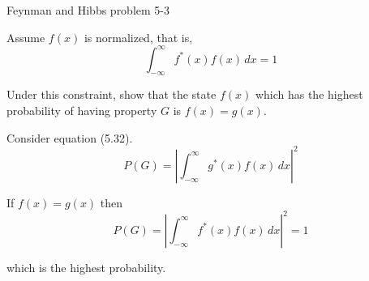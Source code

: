 \documentclass[12pt]{article}
\begin{document}
\begin{center}
Feynman and Hibbs problem 5-3
\end{center}

Assume $f(x)$ is normalized, that is,
\begin{equation*}
\int_{-\infty}^\infty f^*(x)f(x)\,dx=1
\end{equation*}

Under this constraint, show that the state $f(x)$ which has the
highest probability of having property $G$ is $f(x)=g(x)$.

\bigskip
Consider equation (5.32).
\begin{equation*}
P(G)=\left|\int_{-\infty}^\infty g^*(x)f(x)\,dx\right|^2
\tag{5.32}
\end{equation*}

If $f(x)=g(x)$ then
\begin{equation*}
P(G)=\left|\int_{-\infty}^\infty f^*(x)f(x)\,dx\right|^2=1
\end{equation*}

which is the highest probability.
\end{document}
